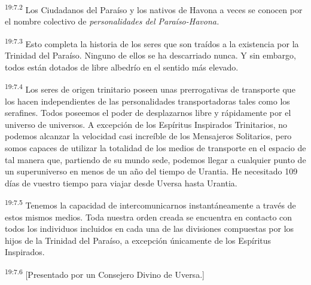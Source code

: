 \par
\textsuperscript{19:7.2} Los Ciudadanos del Paraíso y los nativos de Havona a veces se conocen por el nombre colectivo de \textit{personalidades del Paraíso-Havona.}

\par
\textsuperscript{19:7.3} Esto completa la historia de los seres que son traídos a la existencia por la Trinidad del Paraíso. Ninguno de ellos se ha descarriado nunca. Y sin embargo, todos están dotados de libre albedrío en el sentido más elevado.

\par
\textsuperscript{19:7.4} Los seres de origen trinitario poseen unas prerrogativas de transporte que los hacen independientes de las personalidades transportadoras tales como los serafines. Todos poseemos el poder de desplazarnos libre y rápidamente por el universo de universos. A excepción de los Espíritus Inspirados Trinitarios, no podemos alcanzar la velocidad casi increíble de los Mensajeros Solitarios, pero somos capaces de utilizar la totalidad de los medios de transporte en el espacio de tal manera que, partiendo de su mundo sede, podemos llegar a cualquier punto de un superuniverso en menos de un año del tiempo de Urantia. He necesitado 109 días de vuestro tiempo para viajar desde Uversa hasta Urantia.

\par
\textsuperscript{19:7.5} Tenemos la capacidad de intercomunicarnos instantáneamente a través de estos mismos medios. Toda nuestra orden creada se encuentra en contacto con todos los individuos incluidos en cada una de las divisiones compuestas por los hijos de la Trinidad del Paraíso, a excepción únicamente de los Espíritus Inspirados.

\par
\textsuperscript{19:7.6} [Presentado por un Consejero Divino de Uversa.]